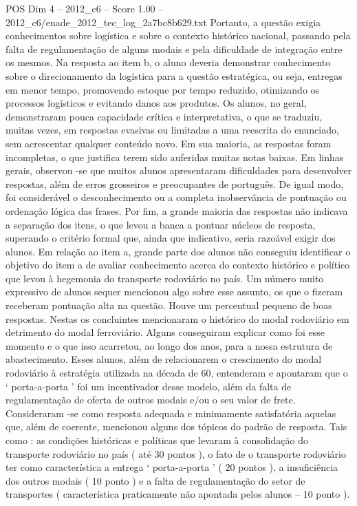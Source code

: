 \begin{textsample}{POS Dim 4 – 2012\_c6 – Score 1.00 – 2012\_c6/enade\_2012\_tec\_log\_2a7bc8b629.txt}
Portanto, a questão exigia conhecimentos sobre logística e sobre o contexto histórico nacional, passando pela falta de regulamentação de alguns modais e pela dificuldade de integração entre os mesmos.
Na resposta ao item b, o aluno deveria demonstrar conhecimento sobre o direcionamento da logística para a questão estratégica, ou seja, entregas em menor tempo, promovendo estoque por tempo reduzido, otimizando os processos logísticos e evitando danos aos produtos.
Os alunos, no geral, demonstraram pouca capacidade crítica e interpretativa, o que se traduziu, muitas vezes, em respostas evasivas ou limitadas a uma reescrita do enunciado, sem acrescentar qualquer conteúdo novo.
Em sua maioria, as respostas foram incompletas, o que justifica terem sido auferidas muitas notas baixas.
Em linhas gerais, observou -se que muitos alunos apresentaram dificuldades para desenvolver respostas, além de erros grosseiros e preocupantes de português.
De igual modo, foi considerável o desconhecimento ou a completa inobservância de pontuação ou ordenação lógica das frases.
Por fim, a grande maioria das respostas não indicava a separação dos itens, o que levou a banca a pontuar núcleos de resposta, superando o critério formal que, ainda que indicativo, seria razoável exigir dos alunos.
Em relação ao item a, grande parte dos alunos não conseguiu identificar o objetivo do item a de avaliar conhecimento acerca do contexto histórico e político que levou à hegemonia do transporte rodoviário no país.
Um número muito expressivo de alunos sequer mencionou algo sobre esse assunto, os que o fizeram receberam pontuação alta na questão.
Houve um percentual pequeno de boas respostas.
Nestas os concluintes mencionaram o histórico do modal rodoviário em detrimento do modal ferroviário.
Alguns conseguiram explicar como foi esse momento e o que isso acarretou, ao longo dos anos, para a nossa estrutura de abastecimento.
Esses alunos, além de relacionarem o crescimento do modal rodoviário à estratégia utilizada na década de 60, entenderam e apontaram que o ‘ porta-a-porta ’ foi um incentivador desse modelo, além da falta de regulamentação de oferta de outros modais e/ou o seu valor de frete.
Consideraram -se como resposta adequada e minimamente satisfatória aquelas que, além de coerente, mencionou alguns dos tópicos do padrão de resposta.
Tais como : as condições históricas e políticas que levaram à consolidação do transporte rodoviário no país ( até 30 pontos ), o fato de o transporte rodoviário ter como característica a entrega ‘ porta-a-porta ’ ( 20 pontos ), a insuficiência dos outros modais ( 10 ponto ) e a falta de regulamentação do setor de transportes ( característica praticamente não apontada pelos alunos – 10 ponto ).

\end{textsample}
